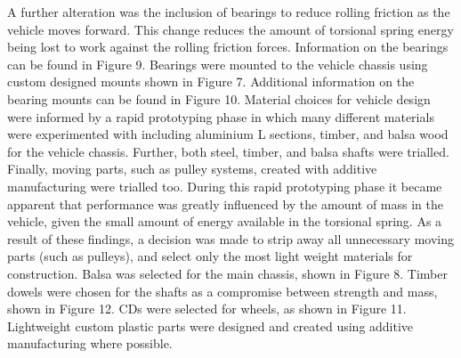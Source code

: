 \documentclass[a4paper]{article}
\begin{document}
A further alteration was the inclusion of bearings to reduce rolling friction as the vehicle moves forward. This change reduces the amount of torsional spring energy being lost to work against the rolling friction forces. Information on the bearings can be found in Figure 9. Bearings were mounted to the vehicle chassis using custom designed mounts shown in Figure 7. Additional information on the bearing mounts can be found in Figure 10. Material choices for vehicle design were informed by a rapid prototyping phase in which many different materials were experimented with including aluminium L sections, timber, and balsa wood for the vehicle chassis. Further, both steel, timber, and balsa shafts were trialled. Finally, moving parts, such as pulley systems, created with additive manufacturing were trialled too. During this rapid prototyping phase it became apparent that performance was greatly influenced by the amount of mass in the vehicle, given the small amount of energy available in the torsional spring. As a result of these findings, a decision was made to strip away all unnecessary moving parts (such as pulleys), and select only the most light weight materials for construction. Balsa was selected for the main chassis, shown in Figure 8. Timber dowels were chosen for the shafts as a compromise between strength and mass, shown in Figure 12. CDs were selected for wheels, as shown in Figure 11. Lightweight custom plastic parts were designed and created using additive manufacturing where possible.

\vspace{1cm}
\end{document}
